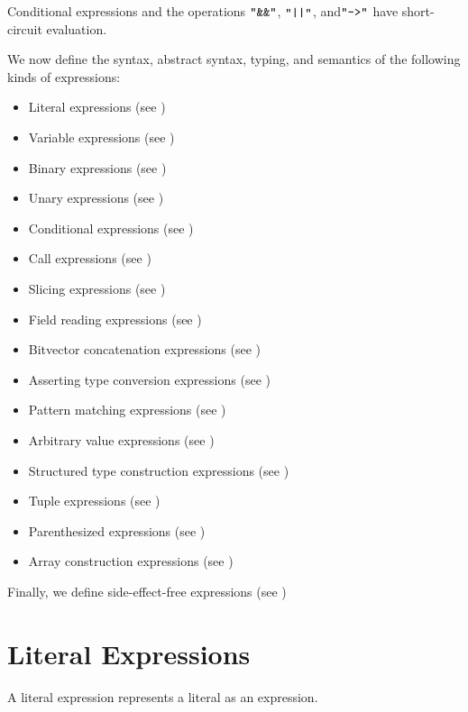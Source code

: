 Conditional expressions and the operations $\texttt{"}\texttt{\&\&}\texttt{"}$, $\texttt{"}\texttt{||}\texttt{"}$, and$\texttt{"}\texttt{-->}\texttt{"}$ have short-circuit evaluation.

We now define the syntax, abstract syntax, typing, and semantics of the following kinds of expressions:
\begin{itemize}
  \item Literal expressions (see )
  \item Variable expressions (see )
  \item Binary expressions (see )
  \item Unary expressions (see )
  \item Conditional expressions (see )
  \item Call expressions (see )
  \item Slicing expressions (see )
  \item Field reading expressions (see )
  \item Bitvector concatenation expressions (see )
  \item Asserting type conversion expressions (see )
  \item Pattern matching expressions (see )
  \item Arbitrary value expressions (see )
  \item Structured type construction expressions (see )
  \item Tuple expressions (see )
  \item Parenthesized expressions (see )
  \item Array construction expressions (see )
\end{itemize}

Finally, we define side-effect-free expressions (see )

\section{Literal Expressions\label{sec:LiteralExpressions}}
A literal expression represents a literal as an expression.

